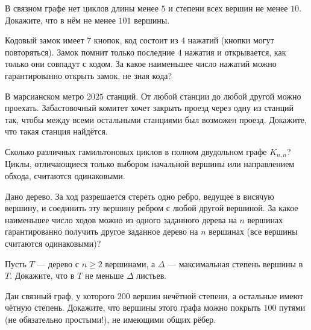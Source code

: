 

\ifPDFTeX
  \renewcommand{\rmdefault}{cmr}
\fi

\def\SheetNo{8}




\begin{problems}

\item В связном графе нет циклов длины менее $5$ и степени всех вершин не менее $10$. Докажите, что в нём не менее $101$ вершины.

\item Кодовый замок имеет $7$ кнопок, код состоит из $4$ нажатий (кнопки могут повторяться). Замок помнит только последние $4$ нажатия и открывается, как только они совпадут с кодом. За какое наименьшее число нажатий можно гарантированно открыть замок, не зная кода?

\item В марсианском метро $2025$ станций. От любой станции до любой другой можно проехать. Забастовочный комитет хочет закрыть проезд через одну из станций так, чтобы между всеми остальными станциями был возможен проезд. Докажите, что такая станция найдётся.

\item Сколько различных гамильтоновых циклов в полном двудольном графе $K_{n,n}$? Циклы, отличающиеся только выбором начальной вершины или направлением обхода, считаются одинаковыми.

\item Дано дерево. За ход разрешается стереть одно ребро, ведущее в висячую вершину, и соединить эту вершину ребром с любой другой вершиной. За какое наименьшее число ходов можно из одного заданного дерева на $n$ вершинах гарантированно получить другое заданное дерево на $n$ вершинах (все вершины считаются одинаковыми)?

\item Пусть $T$ --- дерево с $n\ge2$ вершинами, а $\Delta$ --- максимальная степень вершины в $T$. Докажите, что в $T$ не меньше $\Delta$ листьев.

\item Дан связный граф, у которого $200$ вершин нечётной степени, а остальные имеют чётную степень. Докажите, что вершины этого графа можно покрыть $100$ путями (не обязательно простыми!), не имеющими общих рёбер.


\end{problems}

